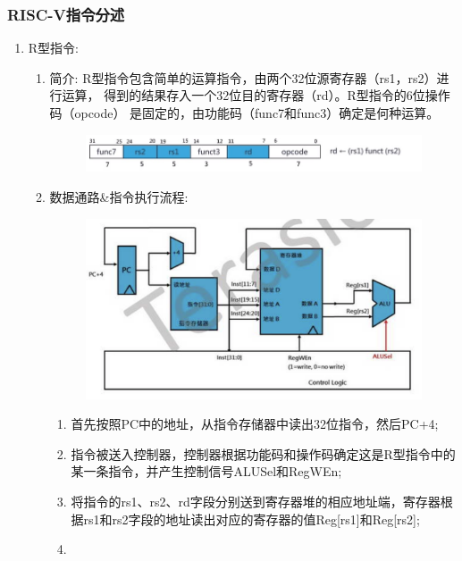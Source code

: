 \documentclass[a4paper, 14pt, oneside]{book} %
\numberwithin{equation}{subsection}
\begin{document}
			\subsubsection{RISC-V指令分述}
			\begin{enumerate}
				\item{R型指令:}
					\begin{enumerate}
						\item{简介:}
							\subitem
								R型指令包含简单的运算指令，由两个32位源寄存器（rs1，rs2）进行运算，
								得到的结果存入一个32位目的寄存器（rd）。R型指令的6位操作码（opcode）
								是固定的，由功能码（func7和func3）确定是何种运算。
								\begin{figure}[!htbp]
									\centering
									\includegraphics[scale=0.5]{img/r1.png}
								\end{figure}
						\item{数据通路\&指令执行流程:}
							\begin{figure}[!htbp]
								\centering
								\includegraphics[scale=0.5]{img/r2.png}
							\end{figure}
							\begin{enumerate}
								\item
									首先按照PC中的地址，从指令存储器中读出32位指令，然后PC+4;
								\item
									指令被送入控制器，控制器根据功能码和操作码确定这是R型指令中的某一条指令，并产生控制信号ALUSel和RegWEn;
								\item
									将指令的rs1、rs2、rd字段分别送到寄存器堆的相应地址端，寄存器根据rs1和rs2字段的地址读出对应的寄存器的值Reg[rs1]和Reg[rs2];
								\item

\end{enumerate}
\end{enumerate}
\end{enumerate}
\end{document}
